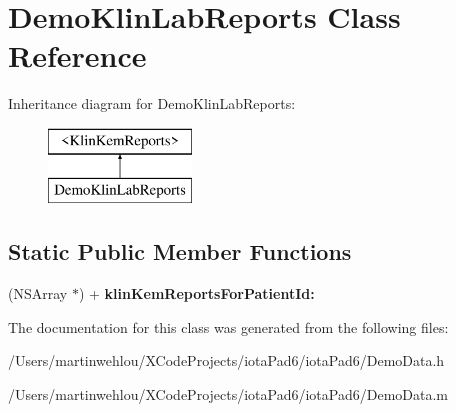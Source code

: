 \hypertarget{interface_demo_klin_lab_reports}{
\section{DemoKlinLabReports Class Reference}
\label{interface_demo_klin_lab_reports}
}
Inheritance diagram for DemoKlinLabReports:\begin{figure}[H]
\begin{center}
\leavevmode
\includegraphics[height=2.000000cm]{interface_demo_klin_lab_reports}
\end{center}
\end{figure}
\subsection*{Static Public Member Functions}
\begin{DoxyCompactItemize}
\item 
\hypertarget{interface_demo_klin_lab_reports_a79c93f959215ef59bb82df52c73c4578}{
(NSArray $\ast$) + {\bfseries klinKemReportsForPatientId:}}
\label{interface_demo_klin_lab_reports_a79c93f959215ef59bb82df52c73c4578}

\end{DoxyCompactItemize}


The documentation for this class was generated from the following files:\begin{DoxyCompactItemize}
\item 
/Users/martinwehlou/XCodeProjects/iotaPad6/iotaPad6/DemoData.h\item 
/Users/martinwehlou/XCodeProjects/iotaPad6/iotaPad6/DemoData.m\end{DoxyCompactItemize}

